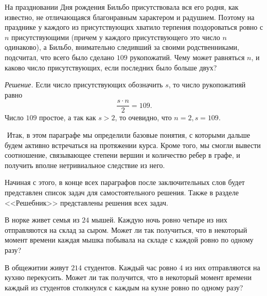 \begin{example}
	На праздновании Дня рождения Бильбо присутствовала вся его родня, как известно, не отличающаяся благонравным характером и радушием. Поэтому на празднике у каждого из присутствующих хватило терпения поздороваться ровно с $n$ присутствующими (причем у каждого присутствующего это число $n$ одинаково), а Бильбо, внимательно следивший за своими родственниками, подсчитал, что всего было сделано $109$ рукопожатий. Чему может равняться $n$, и каково число присутствующих, если последних было больше двух?
	
	\emph{Решение.} Если число присутствующих обозначить $s$, то число рукопожатияй равно $$\frac{s \cdot n}{2} = 109.$$
	Число $109$ простое, а так как $s > 2$, то очевидно, что $n = 2, s = 109$.	
\end{example}

$ $
\newline
	Итак, в этом параграфе мы определили базовые понятия, с которыми дальше будем активно встречаться на протяжении курса. Кроме того, мы смогли вывести соотношение, связывающее степени вершин и количество ребер в графе, и получить вполне нетривиальное следствие из него.
	
	Начиная с этого, в конце всех параграфов после заключительных слов будет представлен список задач для самостоятельного решения. Также в разделе <<Решебник>> представлены решения всех задач.
		

\begin{exersize}
	В норке живет семья из $24$ мышей. Каждую ночь ровно четыре из них отправляются на склад за сыром. Может ли так получиться, что в некоторый момент времени каждая мышка побывала на складе с каждой ровно по одному разу?
\end{exersize}

\begin{exersize}
	В общежитии живут $214$ студентов. Каждый час ровно $4$ из них отправляются на кухню перекусить. Может ли так получится, что в некоторый момент времени каждый из студентов столкнулся с каждым на кухне ровно по одному разу?
\end{exersize}

